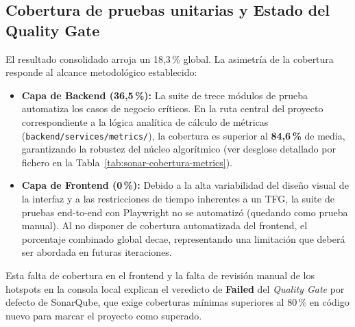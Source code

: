 \subsection{Cobertura de pruebas unitarias y Estado del Quality Gate}
El resultado consolidado arroja un 18,3\,\% global. La asimetría de la cobertura responde al alcance metodológico establecido:
\begin{itemize}
  \item \textbf{Capa de Backend (36,5\,\%):} La suite de trece módulos de prueba automatiza los casos de negocio críticos. En la ruta central del proyecto correspondiente a la lógica analítica de cálculo de métricas (\texttt{backend/services/metrics/}), la cobertura es superior al \textbf{84,6\,\%} de media, garantizando la robustez del núcleo algorítmico (ver desglose detallado por fichero en la Tabla~\ref{tab:sonar-cobertura-metrics}).
  \item \textbf{Capa de Frontend (0\,\%):} Debido a la alta variabilidad del diseño visual de la interfaz y a las restricciones de tiempo inherentes a un TFG, la suite de pruebas end-to-end con Playwright no se automatizó (quedando como prueba manual). Al no disponer de cobertura automatizada del frontend, el porcentaje combinado global decae, representando una limitación que deberá ser abordada en futuras iteraciones.
\end{itemize}

Esta falta de cobertura en el frontend y la falta de revisión manual de los hotspots en la consola local explican el veredicto de \textbf{Failed} del \emph{Quality Gate} por defecto de SonarQube, que exige coberturas mínimas superiores al 80\,\% en código nuevo para marcar el proyecto como superado.

